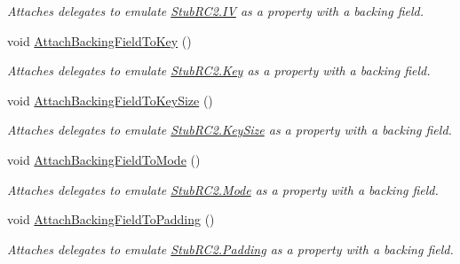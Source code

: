 \begin{DoxyCompactItemize}
\begin{DoxyCompactList}\small\item\em Attaches delegates to emulate \hyperlink{class_system_1_1_security_1_1_cryptography_1_1_fakes_1_1_stub_r_c2_a08becb6e23acebf5b1cacccdc5979f93}{Stub\-R\-C2.\-I\-V} as a property with a backing field.\end{DoxyCompactList}\item 
void \hyperlink{class_system_1_1_security_1_1_cryptography_1_1_fakes_1_1_stub_r_c2_ab4d94ef9156d7a8ed84e569e32fe3154}{Attach\-Backing\-Field\-To\-Key} ()
\begin{DoxyCompactList}\small\item\em Attaches delegates to emulate \hyperlink{class_system_1_1_security_1_1_cryptography_1_1_fakes_1_1_stub_r_c2_a4fb8931cb0c21038d2e80071ec83cbfa}{Stub\-R\-C2.\-Key} as a property with a backing field.\end{DoxyCompactList}\item 
void \hyperlink{class_system_1_1_security_1_1_cryptography_1_1_fakes_1_1_stub_r_c2_a12d2d5df17588cdf8bbb944338681eb1}{Attach\-Backing\-Field\-To\-Key\-Size} ()
\begin{DoxyCompactList}\small\item\em Attaches delegates to emulate \hyperlink{class_system_1_1_security_1_1_cryptography_1_1_fakes_1_1_stub_r_c2_afe0f1538cec6d56c4ea245d165e41f4b}{Stub\-R\-C2.\-Key\-Size} as a property with a backing field.\end{DoxyCompactList}\item 
void \hyperlink{class_system_1_1_security_1_1_cryptography_1_1_fakes_1_1_stub_r_c2_a3fa92bbb8582607850055affe864a544}{Attach\-Backing\-Field\-To\-Mode} ()
\begin{DoxyCompactList}\small\item\em Attaches delegates to emulate \hyperlink{class_system_1_1_security_1_1_cryptography_1_1_fakes_1_1_stub_r_c2_abf2fc1832a62594aafefac68fec9a365}{Stub\-R\-C2.\-Mode} as a property with a backing field.\end{DoxyCompactList}\item 
void \hyperlink{class_system_1_1_security_1_1_cryptography_1_1_fakes_1_1_stub_r_c2_a1196cab7c0ca22f966800d3e6fa63bf9}{Attach\-Backing\-Field\-To\-Padding} ()
\begin{DoxyCompactList}\small\item\em Attaches delegates to emulate \hyperlink{class_system_1_1_security_1_1_cryptography_1_1_fakes_1_1_stub_r_c2_a8ecc1d77fcc4a386c523fce9637932a1}{Stub\-R\-C2.\-Padding} as a property with a backing field.\end{DoxyCompactList}\item 

\end{DoxyCompactItemize}
